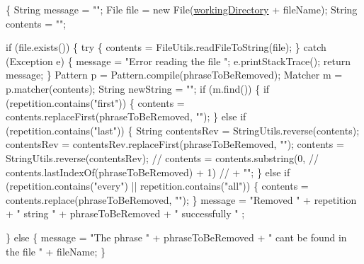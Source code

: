 \begin{DoxyCode}
                             \{
        String message = \textcolor{stringliteral}{""};
        File file = \textcolor{keyword}{new} File(\hyperlink{classcom_1_1poly_1_1nlp_1_1filekommander_1_1file_1_1actions_1_1_file_action_utils_ad54a8fdc9145d2f423c54cb1597f874a}{workingDirectory} + fileName);
        String contents = \textcolor{stringliteral}{""};

        \textcolor{keywordflow}{if} (file.exists()) \{
            \textcolor{keywordflow}{try} \{
                contents = FileUtils.readFileToString(file);
            \} \textcolor{keywordflow}{catch} (Exception e) \{
                message = \textcolor{stringliteral}{"Error reading the file "};
                e.printStackTrace();
                \textcolor{keywordflow}{return} message;
            \}
            Pattern p = Pattern.compile(phraseToBeRemoved);
            Matcher m = p.matcher(contents);
            String newString = \textcolor{stringliteral}{""};
            \textcolor{keywordflow}{if} (m.find()) \{
                \textcolor{keywordflow}{if} (repetition.contains(\textcolor{stringliteral}{"first"})) \{
                    contents = contents.replaceFirst(phraseToBeRemoved, \textcolor{stringliteral}{""});
                \} \textcolor{keywordflow}{else} \textcolor{keywordflow}{if} (repetition.contains(\textcolor{stringliteral}{"last"})) \{
                    String contentsRev = StringUtils.reverse(contents);
                    contentsRev = contentsRev.replaceFirst(phraseToBeRemoved,
                            \textcolor{stringliteral}{""});
                    contents = StringUtils.reverse(contentsRev);
\textcolor{comment}{//                  contents = contents.substring(0,}
\textcolor{comment}{//                          contents.lastIndexOf(phraseToBeRemoved) + 1)}
\textcolor{comment}{//                          + "";}
                \} \textcolor{keywordflow}{else} \textcolor{keywordflow}{if} (repetition.contains(\textcolor{stringliteral}{"every"})
                        || repetition.contains(\textcolor{stringliteral}{"all"})) \{
                    contents = contents.replace(phraseToBeRemoved, \textcolor{stringliteral}{""});
                \}
                message = \textcolor{stringliteral}{"Removed "} + repetition + \textcolor{stringliteral}{" string "} + 
      phraseToBeRemoved + \textcolor{stringliteral}{" successfully "} ;

            \} \textcolor{keywordflow}{else} \{
                message = \textcolor{stringliteral}{"The phrase "} + phraseToBeRemoved
                        + \textcolor{stringliteral}{" cant be found in the file "} + fileName;
            \}


\end{DoxyCode}
